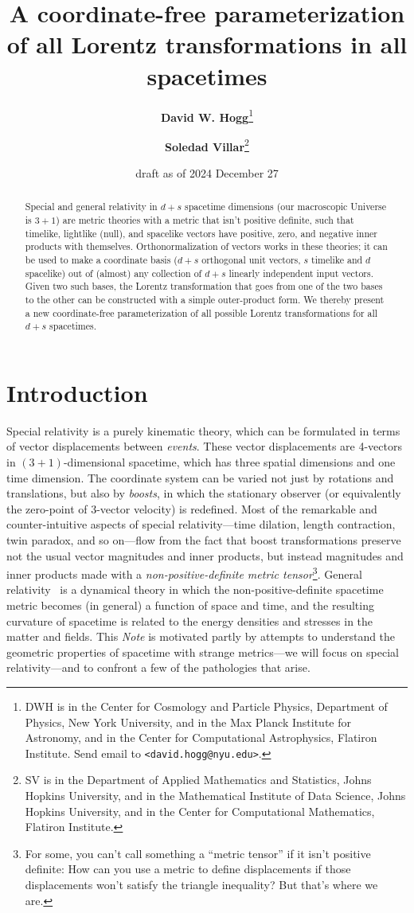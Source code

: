 \documentclass{article}
\title{\bfseries A coordinate-free parameterization of all Lorentz transformations in all spacetimes}
\author{\textbf{David W. Hogg}\footnote{DWH is in the Center for Cosmology and Particle Physics, Department of Physics, New York University, and in the Max Planck Institute for Astronomy, and in the Center for Computational Astrophysics, Flatiron Institute. Send email to \texttt{<david.hogg@nyu.edu>}.}
        \and
        \textbf{Soledad Villar}\footnote{SV is in the Department of Applied Mathematics and Statistics, Johns Hopkins University, and in the Mathematical Institute of Data Science, Johns Hopkins University, and in the Center for Computational Mathematics, Flatiron Institute.}}
\date{draft as of 2024 December 27}
\newcommand{\plus}{\!+\!} %
\newcommand{\documentname}{\textsl{Note}}
\begin{document}
\thispagestyle{plain}
\maketitle

\begin{abstract}\noindent %
    Special and general relativity in $d+s$ spacetime dimensions (our macroscopic Universe is $3+1$) are metric theories with a metric that isn't positive definite, such that timelike, lightlike (null), and spacelike vectors have positive, zero, and negative inner products with themselves.
    Orthonormalization of vectors works in these theories; it can be used to make a coordinate basis ($d+s$ orthogonal unit vectors, $s$ timelike and $d$ spacelike) out of (almost) any collection of $d+s$ linearly independent input vectors.
    Given two such bases, the Lorentz transformation that goes from one of the two bases to the other can be constructed with a simple outer-product form.
    We thereby present a new coordinate-free parameterization of all possible Lorentz transformations for all $d+s$ spacetimes.
\end{abstract}

\section{Introduction}\label{sec:intro}

Special relativity \cite{sr} is a purely kinematic theory, which can be formulated in terms of vector displacements between \emph{events}.
These vector displacements are 4-vectors in $(3\plus1)$-dimensional spacetime, which has three spatial dimensions and one time dimension.
The coordinate system can be varied not just by rotations and translations, but also by \emph{boosts}, in which the stationary observer (or equivalently the zero-point of 3-vector velocity) is redefined.
Most of the remarkable and counter-intuitive aspects of special relativity---time dilation, length contraction, twin paradox, and so on---flow from the fact that boost transformations preserve not the usual vector magnitudes and inner products, but instead magnitudes and inner products made with a \emph{non-positive-definite metric tensor}\footnote{For some, you can't call something a ``metric tensor'' if it isn't positive definite: How can you use a metric to define displacements if those displacements won't satisfy the triangle inequality? But that's where we are.}.
General relativity~\cite{gr} is a dynamical theory in which the non-positive-definite spacetime metric becomes (in general) a function of space and time, and the resulting curvature of spacetime is related to the energy densities and stresses in the matter and fields.
This \documentname{} is motivated partly by attempts to understand the geometric properties of spacetime with strange metrics---we will focus on special relativity---and to confront a few of the pathologies that arise.
\end{document}
